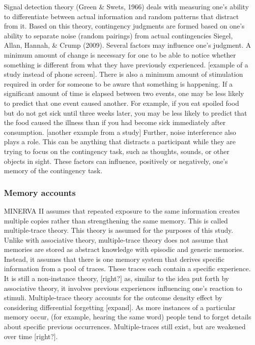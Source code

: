 \documentclass[
  english,
  man,floatsintext]{apa6}
\begin{document}
Signal detection theory (Green \& Swets, 1966) deals with measuring one's ability to differentiate between actual information and random patterns that distract from it. Based on this theory, contingency judgments are formed based on one's ability to separate noise (random pairings) from actual contingencies Siegel, Allan, Hannah, \& Crump (2009). Several factors may influence one's judgment. A minimum amount of change is necessary for one to be able to notice whether something is different from what they have previously experienced. {[}example of a study instead of phone screen{]}. There is also a minimum amount of stimulation required in order for someone to be aware that something is happening. If a significant amount of time is elapsed between two events, one may be less likely to predict that one event caused another. For example, if you eat spoiled food but do not get sick until three weeks later, you may be less likely to predict that the food caused the illness than if you had become sick immediately after consumption. {[}another example from a study{]} Further, noise interference also plays a role. This can be anything that distracts a participant while they are trying to focus on the contingency task, such as thoughts, sounds, or other objects in sight. These factors can influence, positively or negatively, one's memory of the contingency task.

\hypertarget{memory-accounts}{%
\subsubsection{Memory accounts}\label{memory-accounts}}

MINERVA II assumes that repeated exposure to the same information creates multiple copies rather than strengthening the same memory. This is called multiple-trace theory. This theory is assumed for the purposes of this study. Unlike with associative theory, multiple-trace theory does not assume that memories are stored as abstract knowledge with episodic and generic memories. Instead, it assumes that there is one memory system that derives specific information from a pool of traces. These traces each contain a specific experience. It is still a non-instance theory, {[}right?{]} as, similar to the idea put forth by associative theory, it involves previous experiences influencing one's reaction to stimuli. Multiple-trace theory accounts for the outcome density effect by considering differential forgetting {[}expand{]}. As more instances of a particular memory occur, (for example, hearing the same word) people tend to forget details about specific previous occurrences. Multiple-traces still exist, but are weakened over time {[}right?{]}.
\end{document}
